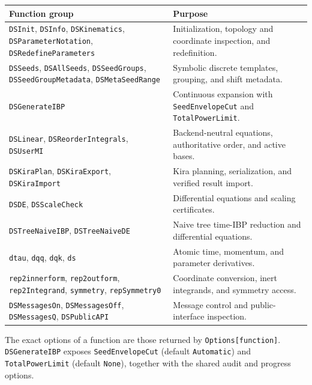 ﻿\documentclass[a4paper,11pt]{article}
\begin{document}
\small
\begin{longtable}{@{}p{}p{}@{}}
\toprule
\textbf{Function group} & \textbf{Purpose} \\
\midrule
\texttt{DSInit}, \texttt{DSInfo}, \texttt{DSKinematics},
\texttt{DSParameterNotation}, \texttt{DSRedefineParameters}
& Initialization, topology and coordinate inspection, and redefinition. \\
\texttt{DSSeeds}, \texttt{DSAllSeeds}, \texttt{DSSeedGroups},
\texttt{DSSeedGroupMetadata}, \texttt{DSMetaSeedRange}
& Symbolic discrete templates, grouping, and shift metadata. \\
\texttt{DSGenerateIBP}
& Continuous expansion with \texttt{SeedEnvelopeCut} and \texttt{TotalPowerLimit}. \\
\texttt{DSLinear}, \texttt{DSReorderIntegrals}, \texttt{DSUserMI}
& Backend-neutral equations, authoritative order, and active bases. \\
\texttt{DSKiraPlan}, \texttt{DSKiraExport}, \texttt{DSKiraImport}
& Kira planning, serialization, and verified result import. \\
\texttt{DSDE}, \texttt{DSScaleCheck}
& Differential equations and scaling certificates. \\
\texttt{DSTreeNaiveIBP}, \texttt{DSTreeNaiveDE}
& Naive tree time-IBP reduction and differential equations. \\
\texttt{dtau}, \texttt{dqq}, \texttt{dqk}, \texttt{ds}
& Atomic time, momentum, and parameter derivatives. \\
\texttt{rep2innerform}, \texttt{rep2outform}, \texttt{rep2Integrand},
\texttt{symmetry}, \texttt{repSymmetry0}
& Coordinate conversion, inert integrands, and symmetry access. \\
\texttt{DSMessagesOn}, \texttt{DSMessagesOff}, \texttt{DSMessagesQ},
\texttt{DSPublicAPI}
& Message control and public-interface inspection. \\
\bottomrule
\end{longtable}
\normalsize

The exact options of a function are those returned by \texttt{Options[function]}.
\texttt{DSGenerateIBP} exposes \texttt{SeedEnvelopeCut} (default \texttt{Automatic})
and \texttt{TotalPowerLimit} (default \texttt{None}), together with the shared audit
and progress options.
\end{document}
